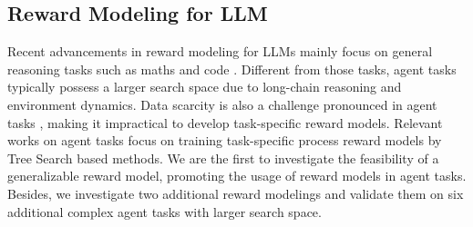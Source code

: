 \subsection{Reward Modeling for LLM}
\label{sec:rmforllm}
Recent advancements in reward modeling for LLMs mainly focus on general reasoning tasks such as maths and code \cite{uesato2022solving,lightman2023let,wang2023math, zhang2024rest}.
Different from those tasks, agent tasks typically possess a larger search space due to long-chain reasoning and environment dynamics.
Data scarcity is also a challenge pronounced in agent tasks \cite{ma2024agentboard}, making it impractical to develop task-specific reward models.
Relevant works on agent tasks \cite{wang2024q, zhai2024enhancingdecisionmakingllmagents, putta2024agent, lin2025qlassboostinglanguageagent} focus on training task-specific process reward models by Tree Search based methods.
We are the first to investigate the feasibility of a generalizable reward model, promoting the usage of reward models in agent tasks.
Besides, we investigate two additional reward modelings and validate them on six additional complex agent tasks with larger search space.